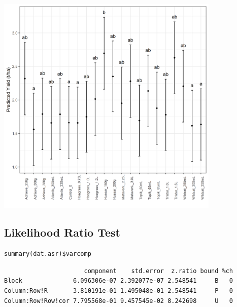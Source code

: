 \documentclass[a4paper, 10pt, fleqn, twosided]{memoir}
\begin{document}
\begin{tcolorbox}[title = Example 6 Graph of predicted Treatment values]
\includegraphics[width=0.8\textwidth, frame]{Example6Pred.png}
\end{tcolorbox}
\clearpage

\subsection{Likelihood Ratio Test}

\begin{tcolorbox}[title = Example 6 Variance Components]
\begin{verbatim}
summary(dat.asr)$varcomp
\end{verbatim}
\end{tcolorbox}

\begin{tcolorbox}[title = Example 6 Variance Component output]
\begin{verbatim}
                      component    std.error  z.ratio bound %ch
Block              6.096306e-07 2.392077e-07 2.548541     B   0
Column:Row!R       3.810191e-01 1.495048e-01 2.548541     P   0
Column:Row!Row!cor 7.795568e-01 9.457545e-02 8.242698     U   0
\end{verbatim}
\end{tcolorbox}
\end{document}
